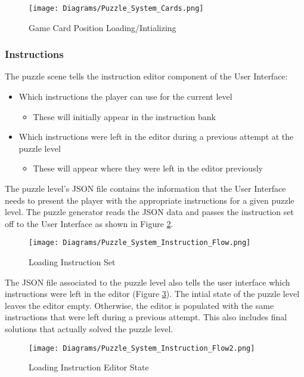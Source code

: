 \begin{figure}[!hb]
  \caption{Game Card Position Loading/Intializing}
  \label{fig:Puzzle_System_Cards}
  \centering
  \texttt{[image: Diagrams/Puzzle\_System\_Cards.png]}
\end{figure}
\newpage

\subsubsection{Instructions}
The puzzle scene tells the instruction editor component of the User Interface:
\begin{itemize}
  \item Which instructions the player can use for the current level
  \begin{itemize}
    \item These will initially appear in the instruction bank
  \end{itemize}
  \item Which instructions were left in the editor during a previous attempt at
  the puzzle level
  \begin{itemize}
    \item These will appear where they were left in the editor previously
  \end{itemize}
\end{itemize}

The puzzle level's JSON file contains the information that the User Interface
needs to present the player with the appropriate instructions for a given puzzle level.
The puzzle generator reads the JSON data and passes the instruction set off to the User Interface
as shown in Figure \ref{fig:Instruction_Flow}.

\begin{figure}[!hb]
  \caption{Loading Instruction Set}
  \label{fig:Instruction_Flow}
  \centering
  \texttt{[image: Diagrams/Puzzle\_System\_Instruction\_Flow.png]}
\end{figure}

The JSON file associated to the puzzle level also tells the user interface which
instructions were left in the editor (Figure \ref{fig:Instruction_Flow2}). The intial state of the puzzle level leaves the
editor empty. Otherwise, the editor is populated with the same instructions that were
left during a previous attempt. This also includes final solutions that actually solved the
puzzle level.

\begin{figure}[!hb]
  \caption{Loading Instruction Editor State}
  \label{fig:Instruction_Flow2}
  \centering
  \texttt{[image: Diagrams/Puzzle\_System\_Instruction\_Flow2.png]}
\end{figure}

